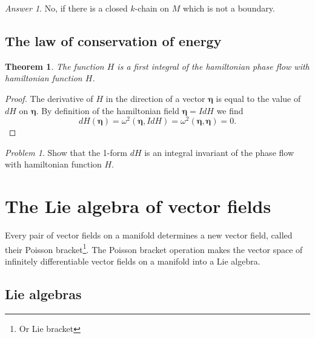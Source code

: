 \documentclass{book}
\numberwithin{equation}{section}
\theoremstyle{plain}
\newtheorem*{thm*}{Theorem}
\theoremstyle{definition}
\theoremstyle{remark}
\theoremstyle{remark}
\newtheorem*{prob*}{Problem}
\newtheorem*{ans*}{Answer}
\begin{document}
\begin{ans*}
  No, if there is a closed $k$-chain on $M$ which is not a boundary.
\end{ans*}


\subsection{The law of conservation of energy}

\begin{thm*}
  The function $H$ is a first integral of the hamiltonian phase flow
  with hamiltonian function $H$.
\end{thm*}

\begin{proof}
  The derivative of $H$ in the direction of a vector $\pmb\eta$
  is equal to the value of $dH$ on $\pmb\eta$.
  By definition of the hamiltonian field
  $\pmb\eta = IdH$ we find
  $$
  dH(\pmb\eta) = \omega^2(\pmb\eta, IdH)
  = \omega^2(\pmb\eta, \pmb\eta) = 0.
  $$
\end{proof}

\begin{prob*}
  Show that the 1-form $dH$ is an integral invariant
  of the phase flow with hamiltonian function $H$.

\end{prob*}


\section{The Lie algebra of vector fields}


Every pair of vector fields on a manifold determines a new vector field,
called their Poisson bracket\footnote{Or Lie bracket}.
%
The Poisson bracket operation makes the vector space of
infinitely differentiable vector fields
on a manifold into a Lie algebra.

\subsection{Lie algebras}
\end{document}

